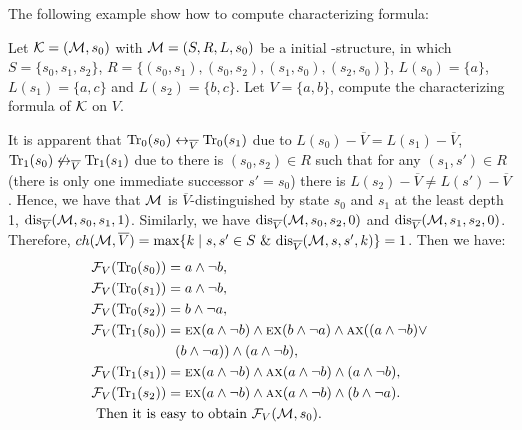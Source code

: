 \documentclass{article}
\begin{document}
The following example show how to compute characterizing formula:
\begin{example}
Let ${\cal K} = ({\cal M}, s_0)$ with ${\cal M}=(S, R, L,s_0)$ be a initial \MPK-structure,%
 in which $S=\{s_0, s_1, s_2\}$, $R=\{(s_0, s_1), (s_0, s_2), (s_1, s_0), (s_2, s_0)\}$, $L(s_0)= \{a\}$, $L(s_1) =\{a,c\}$ and $L(s_2) = \{b,c\}$. Let $V=\{a, b\}$, compute the characterizing formula of ${\cal K}$ on $V$.

It is apparent that $\textrm{Tr}_0(s_0) \leftrightarrow_{\overline V} \textrm{Tr}_0(s_1)$ due to $L(s_0) - \overline V = L(s_1) -\overline V$, $\textrm{Tr}_1(s_0) \not\leftrightarrow_{\overline V} \textrm{Tr}_1(s_1)$ due to there is $(s_0, s_2)\in R$ such that for any $(s_1, s') \in R$ (there is only one immediate successor $s'=s_0$) there is $L(s_2) - \overline V \neq L(s') - \overline V$. Hence, we have that ${\cal M}$ is $\overline V$-distinguished by state $s_0$ and $s_1$ at the least depth 1, \ie $\textrm{dis}_{\overline V}({\cal M}, s_0, s_1, 1)$. Similarly, we have $\textrm{dis}_{\overline V}({\cal M}, s_0, s_2, 0)$ and $\textrm{dis}_{\overline V}({\cal M}, s_1, s_2, 0)$. Therefore, $ch({\cal M}, \overline V) =  \max\{k\mid s,s'\in S\ \&\ \textrm{dis}_{\overline V}({\cal M},s,s',k)\} = 1$.
Then we have:
\begin{align*}
  & {\cal F}_V(\textrm{Tr}_0(s_0)) = a \wedge \neg b, \\
  & {\cal F}_V(\textrm{Tr}_0(s_1)) = a \wedge \neg b, \\
  & {\cal F}_V(\textrm{Tr}_0(s_2)) = b \wedge \neg a, \\
  & {\cal F}_V(\textrm{Tr}_1(s_0)) = \textsc{e}\textsc{x}(a \wedge \neg b)  \wedge \textsc{e}\textsc{x}(b \wedge \neg a) \wedge \textsc{a}\textsc{x}((a \wedge \neg b) \vee\\
  & \qquad \qquad  \qquad (b \wedge \neg a)) \wedge (a \wedge \neg b), \\
  & {\cal F}_V(\textrm{Tr}_1(s_1)) = \textsc{e}\textsc{x}(a \wedge \neg b)  \wedge \textsc{a}\textsc{x}(a \wedge \neg b) \wedge (a \wedge \neg b), \\
  & {\cal F}_V(\textrm{Tr}_1(s_2)) = \textsc{e}\textsc{x}(a \wedge \neg b)  \wedge \textsc{a}\textsc{x}(a \wedge \neg b) \wedge (b \wedge \neg a).\\
  & \mbox{ Then it is easy to obtain\ } {\cal F}_V({\cal M}, s_0).
\end{align*}

\end{example}
\end{document}
